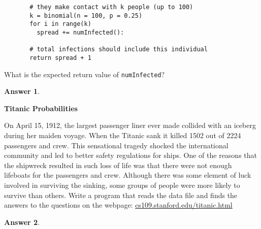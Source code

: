 \documentclass[12pt]{article}
\renewcommand{\(}{\left(}
\renewcommand{\)}{\right)}
\theoremstyle{definition}
\newtheorem*{answer}{Answer}
\begin{document}
\begin{enumerate}
{\begin{framed}
\begin{verbatim}
       # they make contact with k people (up to 100)
       k = binomial(n = 100, p = 0.25)
       for i in range(k)
         spread += numInfected():
         
       # total infections should include this individual
       return spread + 1
    \end{verbatim}
    \end{framed}
    
    What is the expected return value of \texttt{numInfected}?
    \begin{shaded}
    \begin{answer}
    
    \end{answer}
    \end{shaded}

    \newpage
    \textbf{Titanic Probabilities}
    \item On April 15, 1912, the largest passenger liner ever made collided with an iceberg during her maiden voyage. When the Titanic sank it killed 1502 out of 2224 passengers and crew. This sensational tragedy shocked the international community and led to better safety regulations for ships. One of the reasons that the shipwreck resulted in such loss of life was that there were not enough lifeboats for the passengers and crew. Although there was some element of luck involved in surviving the sinking, some groups of people were more likely to survive than others. Write a program that reads the data file and finds the answers to the questions on the webpage: \url{cs109.stanford.edu/titanic.html}
    
    \begin{shaded}
    \begin{answer}
    

\end{answer}
\end{shaded}}
\end{enumerate}
\end{document}
